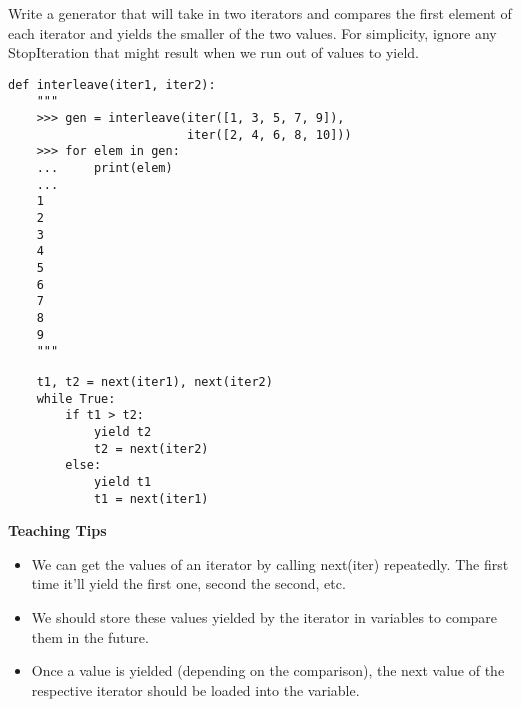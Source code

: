 \begin{blocksection}
\question Write a generator that will take in two iterators and compares the
first element of each iterator and yields the smaller of the two values.
For simplicity, ignore any StopIteration that might result when we run out of
values to yield.

\begin{lstlisting}
def interleave(iter1, iter2):
    """
    >>> gen = interleave(iter([1, 3, 5, 7, 9]),
                         iter([2, 4, 6, 8, 10]))
    >>> for elem in gen:
    ...     print(elem)
    ...
    1
    2
    3
    4
    5
    6
    7
    8
    9
    """
\end{lstlisting}

\begin{solution}[1in]
\begin{lstlisting}
    t1, t2 = next(iter1), next(iter2)
    while True:
        if t1 > t2:
            yield t2
            t2 = next(iter2)
        else:
            yield t1
            t1 = next(iter1)
\end{lstlisting}
\end{solution}
\end{blocksection}

\begin{guide}
\begin{blocksection}
    \textbf{Teaching Tips}
    \begin{itemize}
    \item We can get the values of an iterator by calling next(iter) repeatedly. The first time it'll yield the first one, second the second, etc.
    \item We should store these values yielded by the iterator in variables to compare them in the future.
    \item Once a value is yielded (depending on the comparison), the next value of the respective iterator should be loaded into the variable.
    \end{itemize}
\end{blocksection}
\end{guide}